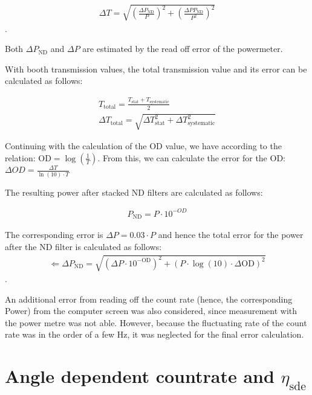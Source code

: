 \begin{align}
    \Delta T= \sqrt{\left(\frac{\Delta P_{\text{ND}}}{P}\right)^2 + \left(\frac{\Delta P P_{\text{ND}}}{ P^2}\right)^2}
\end{align}.

Both $\Delta P_{\text{ND}}$ and $\Delta P$ are estimated by the read off error of the powermeter.


With booth transmission values, the total transmission value and its error can be calculated as follows:

\begin{align}
    T_{\text{total}} = \frac{T_{\text{stat}} + T_{\text{systematic}}}{2}\\
    \Delta T_{\text{total}} = \sqrt{\Delta T_{\text{stat}}^2 + \Delta T_{\text{systematic}}^2}
\end{align}


Continuing with the calculation of the OD value, we have according to \cite{Thorlabs-OD} the relation:
 $\text{OD}= \log(\frac{1}{T})$.
From this, we can calculate the error for the OD: $\Delta OD = \frac{\Delta T}{\ln(10) \cdot T}$


The resulting power after stacked ND filters are calculated as follows:

\begin{align}
    P_{\text{ND}} = P \cdot 10^{-OD}
\end{align}

The corresponding error is  $\Delta P = 0.03 \cdot P $ and hence the total error for the power after the ND filter is calculated as follows:
\begin{align}
    \Leftarrow \Delta P_{\text{ND}} = \sqrt{(\Delta P \cdot 10^{-\text{OD}})^2 + (P \cdot \log(10) \cdot \Delta \text{OD})^2}
\end{align}.

An additional error from reading off the count rate (hence, the corresponding Power) from the computer screen was also considered,
since measurement with the power metre was not able.
However, because the fluctuating rate of the count rate was in the order of a few Hz, it was neglected for the final error calculation.


\section{Angle dependent countrate and $\eta_{\text{sde}}$}\label{sec:countrate_sde_results_appendix}

